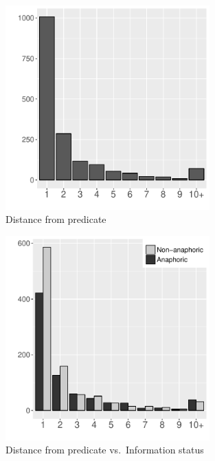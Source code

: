 \begin{figure}
	\includegraphics[width=0.7\textwidth]{figure/DiffAll.pdf}
	\caption{Distance from predicate}
	\label{DiffAllF}
\end{figure}
\begin{figure}
	\includegraphics[width=0.7\textwidth]{figure/DiffInfoStatus.pdf}
	\caption{Distance from predicate vs.\ Information status}
	\label{DiffInfoStatusF}
\end{figure}
